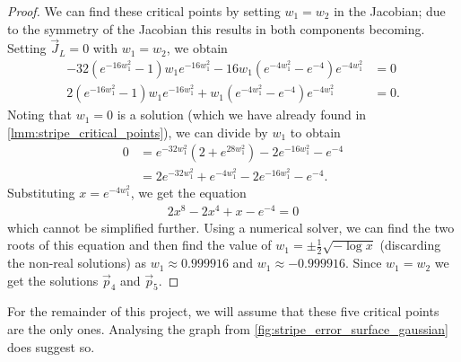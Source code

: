 \begin{proof}
    We can find these critical points by setting $w_1=w_2$ in the Jacobian;
    due to the symmetry of the Jacobian this results in both components becoming. 
    Setting $\vec{J}_L=0$ with $w_1=w_2$, we obtain
    \begin{align*}
        -32 \left(e^{-16 w_1^2} - 1\right) w_1 e^{-16w_1^2}
        -16 w_1 \left(e^{-4 w_1^2} - e^{-4}\right) e^{-4 w_1^2}
        &= 0 \\
        2 \left(e^{-16 w_1^2} - 1\right) w_1 e^{-16w_1^2}
        + w_1 \left(e^{-4 w_1^2} - e^{-4}\right) e^{-4 w_1^2} &= 0.
    \end{align*}
    Noting that $w_1=0$ is a solution (which we have already found in \ref{lmm:stripe_critical_points}), we can divide by $w_1$ to obtain
    \begin{align*}
        0&= e^{-32 w_1^2} \left(2 + e^{28 w_1^2}\right) - 2 e^{-16 w_1^2} - e^{-4} \\
        &= 2 e^{-32 w_1^2} + e^{-4 w_1^2} - 2 e^{-16 w_1^2} - e^{-4}.
    \end{align*}
    Substituting $x = e^{-4w_1^2}$, we get the equation
    \begin{align*}
        2x^8 - 2x^4 + x - e^{-4} = 0
    \end{align*}
    which cannot be simplified further.
    Using a numerical solver, we can find the two roots of this equation and then find the value of $w_1=\pm \frac{1}{2} \sqrt{-\log x}$ (discarding the non-real solutions) as $w_1\approx0.999916$ and $w_1\approx-0.999916$.
    Since $w_1=w_2$ we get the solutions $\vec{p}_4$ and $\vec{p}_5$.
\end{proof}

For the remainder of this project, we will assume that these five critical points are the only ones. 
Analysing the graph from \ref{fig:stripe_error_surface_gaussian} does suggest so.

